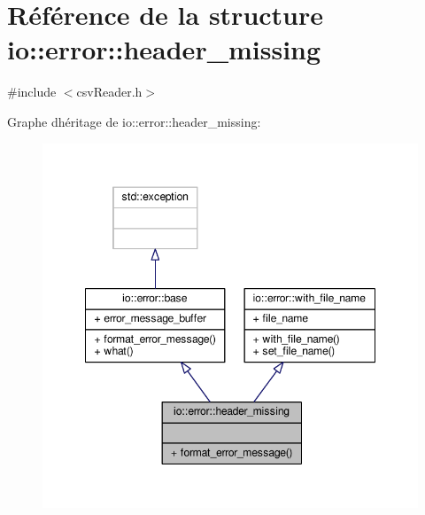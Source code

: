 \hypertarget{structio_1_1error_1_1header__missing}{}\section{Référence de la structure io\+:\+:error\+:\+:header\+\_\+missing}
\label{structio_1_1error_1_1header__missing}


{\ttfamily \#include $<$csv\+Reader.\+h$>$}



Graphe d\textquotesingle{}héritage de io\+:\+:error\+:\+:header\+\_\+missing\+:\nopagebreak
\begin{figure}[H]
\begin{center}
\leavevmode
\includegraphics[width=348pt]{structio_1_1error_1_1header__missing__inherit__graph}
\end{center}
\end{figure}


